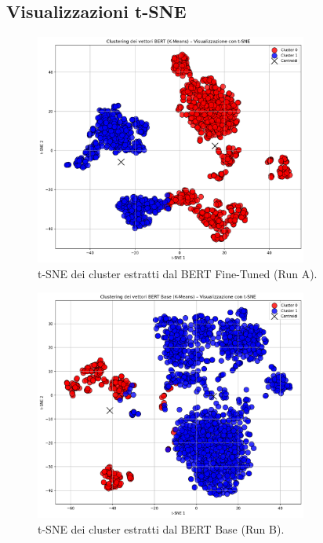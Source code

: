\documentclass[a4paper,12pt]{article}
\begin{document}
\subsection{Visualizzazioni t-SNE}
\begin{figure}[h]
  \centering
  \includegraphics[width=0.8\textwidth]{2.png}
  \caption{t-SNE dei cluster estratti dal BERT Fine-Tuned (Run A).}
  \label{fig:tsne_tuned}
\end{figure}

\begin{figure}[h]
  \centering
  \includegraphics[width=0.8\textwidth]{4.png}
  \caption{t-SNE dei cluster estratti dal BERT Base (Run B).}
  \label{fig:tsne_untuned}
\end{figure}
\end{document}
